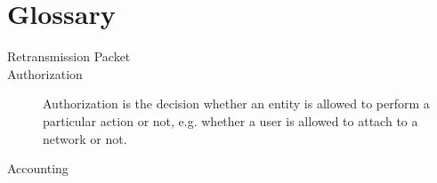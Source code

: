\chapter*{Glossary}


\begin{description}
  \item[Retransmission Packet] 
  \item[Authorization] Authorization is the decision whether an entity is allowed to perform a particular action or not, 
       e.g. whether a user is allowed to attach to a network or not.
  \item[Accounting]
\end{description}
